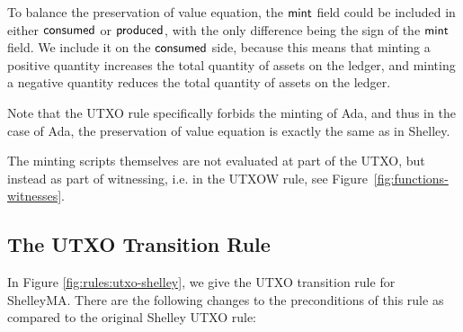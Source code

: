 To balance the preservation of value equation, the $\mathsf{mint}$ field
could be included in either $\mathsf{consumed}$ or $\mathsf{produced}$, with
the only difference being the sign of the $\mathsf{mint}$ field. We
include it on the $\mathsf{consumed}$ side, because this means that
minting a positive quantity increases the total quantity of assets on the
ledger, and minting a negative quantity reduces the total quantity of assets on
the ledger.

Note that the UTXO rule specifically forbids the minting of Ada, and
thus in the case of Ada, the preservation of value equation is exactly
the same as in Shelley.

The minting scripts themselves are not evaluated at part of the UTXO, but instead
as part of witnessing, i.e. in the UTXOW rule, see Figure~\ref{fig:functions-witnesses}.

\subsection*{The UTXO Transition Rule}
In Figure \ref{fig:rules:utxo-shelley}, we give the UTXO transition rule for ShelleyMA.
There are the following changes to the preconditions
of this rule as compared to the original Shelley UTXO rule:

